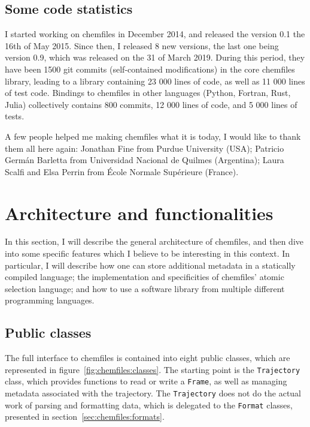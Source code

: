 \documentclass[thesis]{subfiles}
\begin{document}
\subsection{Some code statistics}

I started working on chemfiles in December 2014, and released the version 0.1
the 16th of May 2015. Since then, I released 8 new versions, the last one being
version 0.9, which was released on the 31 of March 2019. During this period,
they have been 1500 git commits (self-contained modifications) in the core \cxx
chemfiles library, leading to a library containing 23 000 lines of code, as well
as 11 000 lines of test code. Bindings to chemfiles in other languages (Python,
Fortran, Rust, Julia) collectively contains 800 commits, 12 000 lines of code,
and 5 000 lines of tests.

A few people helped me making chemfiles what it is today, I would like to thank
them all here again: Jonathan Fine from Purdue University (USA); Patricio Germán
Barletta from Universidad Nacional de Quilmes (Argentina); Laura Scalfi and Elsa
Perrin from École Normale Supérieure (France).

\newpage
\section{Architecture and functionalities}

In this section, I will describe the general architecture of chemfiles, and then
dive into some specific features which I believe to be interesting in this
context. In particular, I will describe how one can store additional metadata in
a statically compiled language; the implementation and specificities of chemfiles'
atomic selection language; and how to use a software library from multiple
different programming languages.

\subsection{Public classes}

The full interface to chemfiles is contained into eight public classes, which
are represented in figure~\ref{fig:chemfiles:classes}. The starting point is the
\texttt{Trajectory} class, which provides functions to read or write a
\texttt{Frame}, as well as managing metadata associated with the trajectory. The
\texttt{Trajectory} does not do the actual work of parsing and formatting data,
which is delegated to the \texttt{Format} classes, presented in
section~\ref{sec:chemfiles:formats}.
\end{document}
